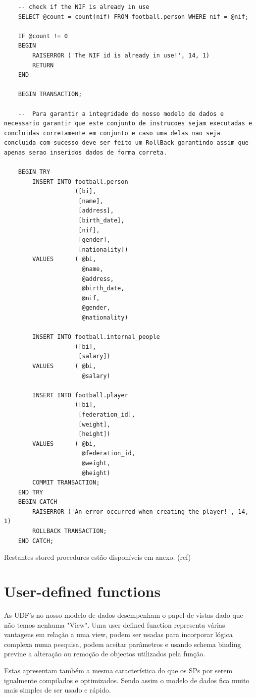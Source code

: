 \documentclass[pdftex,12pt,a4paper]{report}
\begin{document}
\begin{lstlisting}
	-- check if the NIF is already in use
	SELECT @count = count(nif) FROM football.person WHERE nif = @nif;

	IF @count != 0
	BEGIN
		RAISERROR ('The NIF id is already in use!', 14, 1)
		RETURN
	END

	BEGIN TRANSACTION;
	
	--  Para garantir a integridade do nosso modelo de dados e necessario garantir que este conjunto de instrucoes sejam executadas e concluidas corretamente em conjunto e caso uma delas nao seja concluida com sucesso deve ser feito um RollBack garantindo assim que apenas serao inseridos dados de forma correta.
	
	BEGIN TRY
		INSERT INTO football.person 
					([bi], 
					 [name], 
					 [address], 
					 [birth_date], 
					 [nif], 
					 [gender],
					 [nationality]) 
		VALUES      ( @bi, 
					  @name, 
					  @address, 
					  @birth_date, 
					  @nif, 
					  @gender,
					  @nationality) 

		INSERT INTO football.internal_people 
					([bi], 
					 [salary]) 
		VALUES      ( @bi, 
					  @salary) 

		INSERT INTO football.player 
					([bi], 
					 [federation_id], 
					 [weight],
					 [height]) 
		VALUES      ( @bi, 
					  @federation_id, 
					  @weight,
					  @height)
		COMMIT TRANSACTION;
	END TRY
	BEGIN CATCH
		RAISERROR ('An error occurred when creating the player!', 14, 1)
		ROLLBACK TRANSACTION;
	END CATCH;

\end{lstlisting}
 \vspace{0,5in}

Restantes stored procedures estão disponíveis em anexo. (ref)

\newpage

\section{User-defined functions}
As UDF's no nosso modelo de dados desempenham o papel de vistas dado que não temos nenhuma "View". Uma user defined function representa várias vantagens em relação a uma view, podem ser usadas para incorporar lógica complexa numa pesquisa, podem aceitar parâmetros e usando schema binding previne a alteração ou remoção de objectos utilizados pela função.

Estas apresentam também a mesma característica do que os SPs por serem igualmente compilados e optimizados. Sendo assim o modelo de dados fica muito mais simples de ser usado e rápido.
\end{document}
